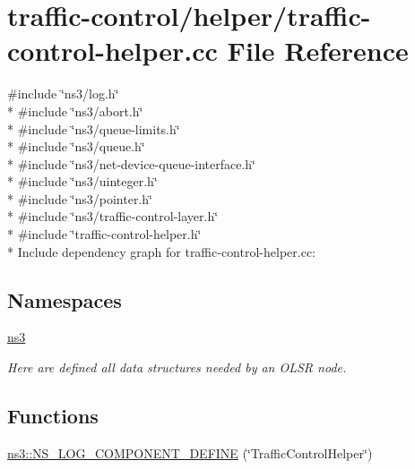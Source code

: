 \hypertarget{traffic-control-helper_8cc}{}\section{traffic-\/control/helper/traffic-\/control-\/helper.cc File Reference}
\label{traffic-control-helper_8cc}
{\ttfamily \#include \char`\"{}ns3/log.\+h\char`\"{}}\\*
{\ttfamily \#include \char`\"{}ns3/abort.\+h\char`\"{}}\\*
{\ttfamily \#include \char`\"{}ns3/queue-\/limits.\+h\char`\"{}}\\*
{\ttfamily \#include \char`\"{}ns3/queue.\+h\char`\"{}}\\*
{\ttfamily \#include \char`\"{}ns3/net-\/device-\/queue-\/interface.\+h\char`\"{}}\\*
{\ttfamily \#include \char`\"{}ns3/uinteger.\+h\char`\"{}}\\*
{\ttfamily \#include \char`\"{}ns3/pointer.\+h\char`\"{}}\\*
{\ttfamily \#include \char`\"{}ns3/traffic-\/control-\/layer.\+h\char`\"{}}\\*
{\ttfamily \#include \char`\"{}traffic-\/control-\/helper.\+h\char`\"{}}\\*
Include dependency graph for traffic-\/control-\/helper.cc\+:
\subsection*{Namespaces}
\begin{DoxyCompactItemize}
\item 
 \hyperlink{namespacens3}{ns3}
\begin{DoxyCompactList}\small\item\em Here are defined all data structures needed by an O\+L\+SR node. \end{DoxyCompactList}\end{DoxyCompactItemize}
\subsection*{Functions}
\begin{DoxyCompactItemize}
\item 
\hyperlink{namespacens3_a233a8c2007d84ae14bbbb7eeaad12b4d}{ns3\+::\+N\+S\+\_\+\+L\+O\+G\+\_\+\+C\+O\+M\+P\+O\+N\+E\+N\+T\+\_\+\+D\+E\+F\+I\+NE} (\char`\"{}Traffic\+Control\+Helper\char`\"{})
\end{DoxyCompactItemize}
